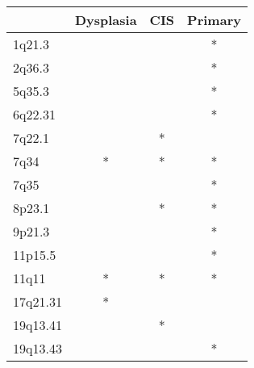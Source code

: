 \begin{tabular}{lccc}
\toprule
{} & Dysplasia & CIS & Primary \\
\midrule
1q21.3   &           &     &       * \\
2q36.3   &           &     &       * \\
5q35.3   &           &     &       * \\
6q22.31  &           &     &       * \\
7q22.1   &           &   * &         \\
7q34     &         * &   * &       * \\
7q35     &           &     &       * \\
8p23.1   &           &   * &       * \\
9p21.3   &           &     &       * \\
11p15.5  &           &     &       * \\
11q11    &         * &   * &       * \\
17q21.31 &         * &     &         \\
19q13.41 &           &   * &         \\
19q13.43 &           &     &       * \\
\bottomrule
\end{tabular}
